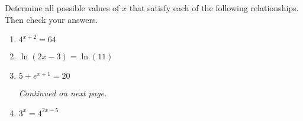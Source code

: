 


Determine all possible values of $x$ that satisfy each of the
following relationships.  Then check your answers.
\begin{enumerate}
\item $\displaystyle 4^{x+2}=64$
\vfill
\item $\ln(2x-3)=\ln(11)$
  \vfill

\item $\displaystyle 5+e^{x+1}=20$
\vfill
\vfill

\textit{Continued on next page.}

\clearpage

\item $3^x=4^{2x-5}$

\vfill

\end{enumerate}



